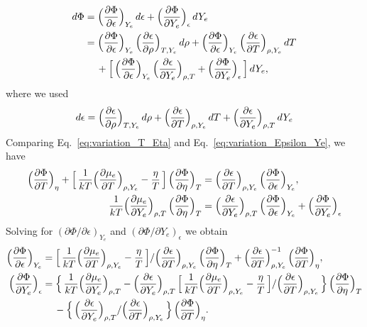 \documentclass[12pt]{article}
\begin{document}
\begin{align}
  d\Phi
  &=\Big(\frac{\partial \Phi}{\partial \epsilon}\Big)_{Y_{e}}\,d\epsilon+\Big(\frac{\partial \Phi}{\partial Y_{e}}\Big)_{\epsilon}\,dY_{e} \nonumber \\
  &=\Big(\frac{\partial \Phi}{\partial \epsilon}\Big)_{Y_{e}}\,\Big(\frac{\partial \epsilon}{\partial \rho}\Big)_{T,Y_{e}}\,d\rho
  +\Big(\frac{\partial \Phi}{\partial \epsilon}\Big)_{Y_{e}}\,\Big(\frac{\partial \epsilon}{\partial T}\Big)_{\rho,Y_{e}}\,dT \nonumber \\
  &\hspace{12pt}
  +\Big[\,\Big(\frac{\partial \Phi}{\partial \epsilon}\Big)_{Y_{e}}\,\Big(\frac{\partial \epsilon}{\partial Y_{e}}\Big)_{\rho,T}+\Big(\frac{\partial \Phi}{\partial Y_{e}}\Big)_{\epsilon}\,\Big]\,dY_{e},
  \label{eq:variation_Epsilon_Ye}
\end{align}
where we used
\begin{equation}
  d\epsilon
  =\Big(\frac{\partial \epsilon}{\partial \rho}\Big)_{T,Y_{e}}\,d\rho+\Big(\frac{\partial \epsilon}{\partial T}\Big)_{\rho,Y_{e}}\,dT+\Big(\frac{\partial \epsilon}{\partial Y_{e}}\Big)_{\rho,T}\,dY_{e}
\end{equation}
Comparing Eq.~\eqref{eq:variation_T_Eta} and Eq.~\eqref{eq:variation_Epsilon_Ye}, we have
\begin{align}
  \Big(\frac{\partial \Phi}{\partial T}\Big)_{\eta} + \Big[\,\frac{1}{kT}\Big(\frac{\partial \mu_{e}}{\partial T}\Big)_{\rho,Y_{e}}-\frac{\eta}{T}\,\Big]\,\Big(\frac{\partial \Phi}{\partial \eta}\Big)_{T}
  &=\Big(\frac{\partial \epsilon}{\partial T}\Big)_{\rho,Y_{e}}\,\Big(\frac{\partial \Phi}{\partial \epsilon}\Big)_{Y_{e}}, \\
  \frac{1}{kT}\Big(\frac{\partial \mu_{e}}{\partial Y_{e}}\Big)_{\rho,T}\,\Big(\frac{\partial \Phi}{\partial \eta}\Big)_{T}
  &=\Big(\frac{\partial \epsilon}{\partial Y_{e}}\Big)_{\rho,T}\,\Big(\frac{\partial \Phi}{\partial \epsilon}\Big)_{Y_{e}}+\Big(\frac{\partial \Phi}{\partial Y_{e}}\Big)_{\epsilon}
\end{align}
Solving for $(\partial\Phi/\partial\epsilon)_{Y_{e}}$ and $(\partial\Phi/\partial Y_{e})_{\epsilon}$ we obtain
\begin{align}
  \Big(\frac{\partial \Phi}{\partial \epsilon}\Big)_{Y_{e}}
  &=\Big[\,\frac{1}{kT}\Big(\frac{\partial \mu_{e}}{\partial T}\Big)_{\rho,Y_{e}}-\frac{\eta}{T}\,\Big]/\Big(\frac{\partial \epsilon}{\partial T}\Big)_{\rho,Y_{e}}\,\Big(\frac{\partial \Phi}{\partial \eta}\Big)_{T} + \Big(\frac{\partial \epsilon}{\partial T}\Big)_{\rho,Y_{e}}^{-1}\,\Big(\frac{\partial \Phi}{\partial T}\Big)_{\eta}, \\
  \Big(\frac{\partial \Phi}{\partial Y_{e}}\Big)_{\epsilon}
  &=\Big\{\,\frac{1}{kT}\Big(\frac{\partial \mu_{e}}{\partial Y_{e}}\Big)_{\rho,T} - \Big(\frac{\partial \epsilon}{\partial Y_{e}}\Big)_{\rho,T}\,\Big[\,\frac{1}{kT}\Big(\frac{\partial \mu_{e}}{\partial T}\Big)_{\rho,Y_{e}}-\frac{\eta}{T}\,\Big]/\Big(\frac{\partial \epsilon}{\partial T}\Big)_{\rho,Y_{e}}\,\Big\}\,\Big(\frac{\partial \Phi}{\partial \eta}\Big)_{T} \nonumber \\
  &\hspace{12pt}
  - \Big\{\,\Big(\frac{\partial \epsilon}{\partial Y_{e}}\Big)_{\rho,T}/\Big(\frac{\partial \epsilon}{\partial T}\Big)_{\rho,Y_{e}}\,\Big\}\,\Big(\frac{\partial \Phi}{\partial T}\Big)_{\eta}.
\end{align}
\end{document}
